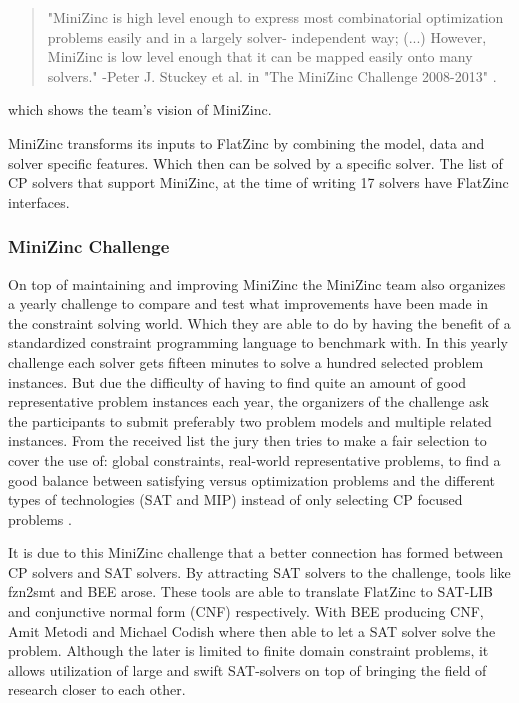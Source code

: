 \begin{quote}
	"MiniZinc is high level enough to express most combinatorial optimization problems easily and in a largely solver-
	independent way; (...) However, MiniZinc is low level enough that it can be mapped easily onto many solvers." 
	\newline
	-Peter J. Stuckey et al. in "The MiniZinc Challenge 2008-2013" \cite{58stuckey2014minizinc}.
\end{quote} which shows the team's vision of MiniZinc.

MiniZinc transforms its inputs to FlatZinc by combining the model, data and solver specific features. Which then can be solved by a specific solver. The list of CP solvers that support MiniZinc, at the time of writing 17 solvers have FlatZinc interfaces.

\subsubsection{MiniZinc Challenge}
On top of maintaining and improving MiniZinc the MiniZinc team also organizes a yearly challenge to compare and test what improvements have been made in the constraint solving world. Which they are able to do by having the benefit of a standardized constraint programming language to benchmark with. 
In this yearly challenge each solver gets fifteen minutes to solve a hundred selected problem instances. But due the difficulty of having to find quite an amount of good representative problem instances each year, the organizers of the challenge ask the participants to submit preferably two problem models and multiple related instances. From the received list the jury then tries to make a fair selection to cover the use of: global constraints, real-world representative problems, to find a good balance between satisfying versus optimization problems and the different types of technologies (SAT and MIP) instead of only selecting CP focused problems \cite{58stuckey2014minizinc}.

It is due to this MiniZinc challenge that a better connection has formed between CP solvers and SAT solvers. By attracting SAT solvers to the challenge, tools like fzn2smt \cite{72bofill2010system} and BEE \cite{69BEEmetodi2012compiling} arose. These tools are able to translate FlatZinc to SAT-LIB and conjunctive normal form (CNF) respectively. 
With BEE producing CNF, Amit Metodi and Michael Codish where then able to let a SAT solver solve the problem. Although the later is limited to finite domain constraint problems, it allows utilization of large and swift SAT-solvers on top of bringing the field of research closer to each other.

